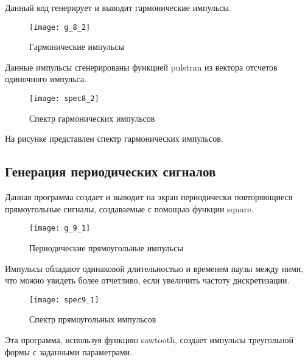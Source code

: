 
\parindent=1cm
Данный код генерирует и выводит гармонические импульсы.

\begin{figure}[H]
	\begin{center}
		\texttt{[image: g\_8\_2]}
		\caption{Гармонические импульсы} 
		\label{pic:g_8_2} %
	\end{center}
\end{figure}
Данные импульсы сгенерированы функцией pulstran из вектора отсчетов одиночного импульса.
\begin{figure}[H]
	\begin{center}
		\texttt{[image: spec8\_2]}
		\caption{Спектр гармонических импульсов} 
		\label{pic:spec8_2} %
	\end{center}
\end{figure}
На рисунке представлен спектр гармонических импульсов.


\subsection{Генерация периодических сигналов}


\parindent=1cm
Данная программа создает и выводит на экран периодически повторяющиеся прямоугольные сигналы, создаваемые с помощью функции square.

\begin{figure}[H]
	\begin{center}
		\texttt{[image: g\_9\_1]}
		\caption{Периодические прямоугольные импульсы} 
		\label{pic:g_9_1} %
	\end{center}
\end{figure}
Импульсы обладают одинаковой длительностью и временем паузы между ними, что можно увидеть более отчетливо, если увеличить частоту дискретизации.
\begin{figure}[H]
	\begin{center}
		\texttt{[image: spec9\_1]}
		\caption{Спектр прямоугольных импульсов} 
		\label{pic:spec9_1} %
	\end{center}
\end{figure}


\parindent=1cm
Эта программа, используя функцию sawtooth, создает импульсы треугольной формы с заданными параметрами.

